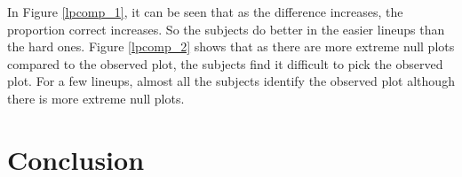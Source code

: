 \documentclass[12]{article}
\newcommand{\red}[1]{{\color{red} #1}}
\newcommand{\green}[1]{{\color{cyan} #1}}
\begin{document}
In Figure \ref{lpcomp_1}, it can be seen that as the difference increases, the proportion correct increases. So the subjects do better in the easier lineups than the hard ones. Figure \ref{lpcomp_2} shows that as there are more extreme null plots compared to the observed plot, the subjects find it difficult to pick the observed plot. For a few lineups, almost all the subjects identify the observed plot although there is more extreme null plots. 




\section{Conclusion}
 
%




\end{document}

